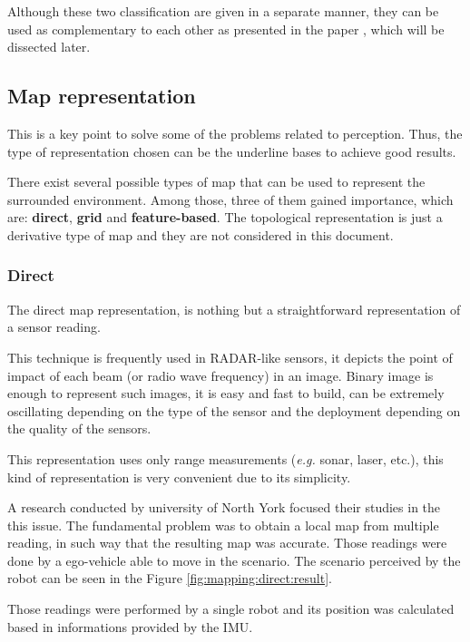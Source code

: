 Although these two classification are given in a separate manner, they can be used as complementary to each other as presented in the paper \cite{Wang04a}, which will be dissected later.

\subsection{Map representation}

This is a key point to solve some of the problems related to perception. Thus, the type of representation chosen can be the underline bases to achieve good results.

There exist several possible types of map that can be used to represent the surrounded environment. Among those, three of them gained importance, which are: \textbf{direct}, \textbf{grid} and \textbf{feature-based}\cite{Wang04a}. The topological representation is just a derivative type of map and they are not considered in this document.

\subsubsection{Direct}

The direct map representation, is nothing but a straightforward representation of a sensor reading. 

This technique is frequently used in RADAR-like sensors, it depicts the point of impact of each beam (or radio wave frequency) in an image. Binary image is enough to represent such images, it is easy and fast to build, can be extremely oscillating depending on the type of the sensor and the deployment depending on the quality of the sensors.

This representation uses only range measurements (\textit{e.g.} sonar, laser, etc.), this kind of representation is very convenient due to its simplicity. 

A research conducted by university of North York\cite{Lu:1997:GCR:591441.591464} focused their studies in the this issue. The fundamental problem was to obtain a local map from multiple reading, in such way that the resulting map was accurate. Those readings were done by a ego-vehicle able to move in the scenario. The scenario perceived by the robot can be seen in the Figure \ref{fig:mapping:direct:result}.

Those readings were performed by a single robot and its position was calculated based in informations provided by the IMU.


